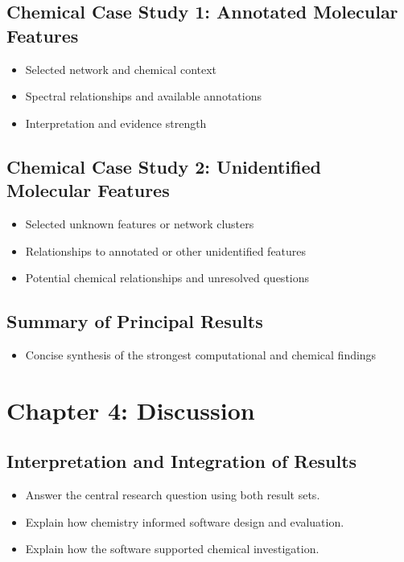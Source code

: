 \documentclass[11pt]{article}
\begin{document}
\begin{doublespace}
    \subsection{Chemical Case Study 1: Annotated Molecular Features}
        \begin{itemize}
            \item Selected network and chemical context
            \item Spectral relationships and available annotations
            \item Interpretation and evidence strength
        \end{itemize}
    
    \subsection{Chemical Case Study 2: Unidentified Molecular Features}
        \begin{itemize}
            \item Selected unknown features or network clusters
            \item Relationships to annotated or other unidentified features
            \item Potential chemical relationships and unresolved questions
        \end{itemize}

    \subsection{Summary of Principal Results}
        \begin{itemize}
            \item Concise synthesis of the strongest computational and chemical findings
        \end{itemize}

\section{Chapter 4: Discussion}
    \subsection{Interpretation and Integration of Results}
        \begin{itemize}
            \item Answer the central research question using both result sets.
            \item Explain how chemistry informed software design and evaluation.
            \item Explain how the software supported chemical investigation.
        \end{itemize}
    

\end{doublespace}
\end{document}

